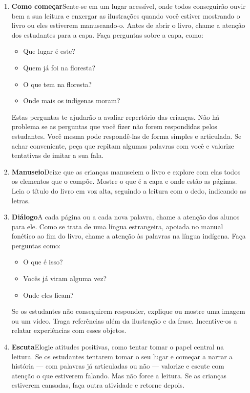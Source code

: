 \documentclass[11pt]{extarticle}
\begin{document}
\begin{enumerate}
\item \textbf{Como começar}\quad Sente-se em um lugar acessível, 
onde todos conseguirão ouvir bem a sua leitura e enxergar as ilustrações 
quando você estiver mostrando o livro ou eles estiverem manuseando-o. 
Antes de abrir o livro, chame a atenção dos estudantes para a capa. 
Faça perguntas sobre a capa, como: 

\begin{itemize}
\item Que lugar é este?
\item Quem já foi na floresta?
\item O que tem na floresta?
\item Onde mais os indígenas moram?
\end{itemize}

Estas perguntas te ajudarão a avaliar repertório das crianças. 
Não há problema se as perguntas que você fizer não forem respondidas pelos 
estudantes. Você mesma pode respondê-las de forma simples e articulada. Se achar 
conveniente, peça que repitam algumas palavras com você e valorize tentativas 
de imitar a sua fala. 

\item \textbf{Manuseio}\quad Deixe que as crianças manuseiem o livro 
e explore com elas todos os elementos que o compõe. Mostre o que é a 
capa e onde estão as páginas. Leia o título do livro em voz alta, seguindo 
a leitura com o dedo, indicando as letras. 

\item \textbf{Diálogo}\quad A cada página ou a cada nova palavra,
chame a atenção dos alunos para ele. Como se trata de uma língua estrangeira, 
apoiada no manual fonético ao fim do livro, chame a atenção às palavras na língua 
indígena. Faça perguntas como:

\begin{itemize}
\item O que é isso?
\item Vocês já viram alguma vez? 
\item Onde eles ficam? 
\end{itemize}

Se os estudantes não conseguirem responder, explique ou mostre uma 
imagem ou um vídeo. Traga referências além da ilustração e da frase. 
Incentive-os a relatar experiências com esses objetos.

\item \textbf{Escuta}\quad Elogie atitudes positivas, como 
tentar tomar o papel central na leitura. Se os estudantes tentarem 
tomar o seu lugar e começar a narrar a história --- com palavras já articuladas 
ou não --- valorize e escute com atenção o que estiverem falando. Mas não 
force a leitura. Se as crianças estiverem cansadas, faça outra atividade 
e retorne depois. 


\end{enumerate}
\end{document}
